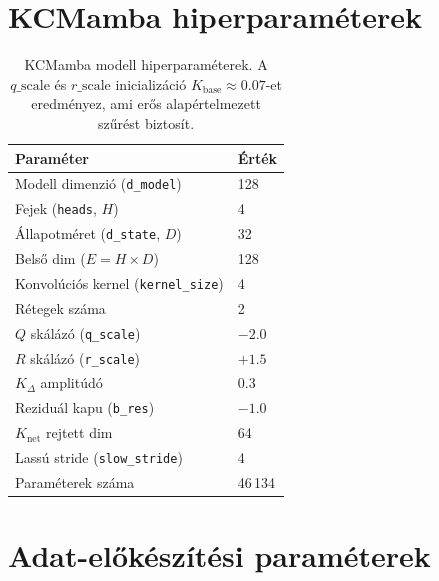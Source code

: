 \section{KCMamba hiperparaméterek}

\begin{table}[H]
    \centering
    \begin{tabular}{|l|l|}
        \hline
        \textbf{Paraméter} & \textbf{Érték} \\
        \hline\hline
        Modell dimenzió (\texttt{d\_model})    & 128 \\
        Fejek (\texttt{heads}, $H$)            & 4 \\
        Állapotméret (\texttt{d\_state}, $D$)  & 32 \\
        Belső dim ($E = H \times D$)           & 128 \\
        Konvolúciós kernel (\texttt{kernel\_size}) & 4 \\
        Rétegek száma                          & 2 \\
        $Q$ skálázó (\texttt{q\_scale})        & $-2.0$ \\
        $R$ skálázó (\texttt{r\_scale})        & $+1.5$ \\
        $K_\Delta$ amplitúdó                   & $0.3$ \\
        Reziduál kapu (\texttt{b\_res})        & $-1.0$ \\
        $K_\text{net}$ rejtett dim             & 64 \\
        Lassú stride (\texttt{slow\_stride})   & 4 \\
        Paraméterek száma                      & 46\,134 \\
        \hline
    \end{tabular}
    \caption{KCMamba modell hiperparaméterek. A $q\_\text{scale}$ és
             $r\_\text{scale}$ inicializáció $K_\text{base} \approx 0.07$-et
             eredményez, ami erős alapértelmezett szűrést biztosít.}
    \label{tab:app_kcmamba}
\end{table}

\section{Adat-előkészítési paraméterek}

